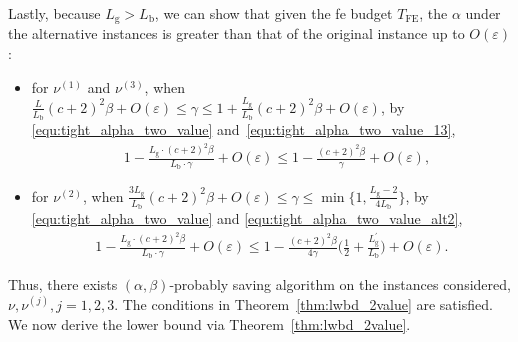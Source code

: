 \documentclass[twoside,11pt]{article}
\newcommand{\rmb}{\mathrm{b}}
\newcommand{\rmg}{\mathrm{g}}
\newcommand{\Tfe}{T_{\mathrm{FE}}}
\begin{document}
Lastly, because $L_{\rmg}>L_{\rmb}$, we can show that given the \ac{fe} budget $\Tfe$, the $\alpha$ under the alternative instances is greater than that of the original instance up to $O(\varepsilon)$:
\begin{itemize}[leftmargin=1em,parsep=1pt]
    \item for $\nu^{(1)}$ and $\nu^{(3)}$, when $ \frac{L}{L_{\rmb}} (c+2)^2\beta  + O(\varepsilon) \leq \gamma \leq
            1 +  \frac{L_{\rmg}}{L_{\rmb}} (c+2)^2\beta + O(\varepsilon)$,
            by \eqref{equ:tight_alpha_two_value} and~\eqref{equ:tight_alpha_two_value_13},
        \begin{align}
            &1-\frac{L_{\rmg}\cdot (c+2)^2\beta}{L_{\rmb}\cdot\gamma}+O(\varepsilon)
            \leq
            1-\frac{(c+2)^2\beta}{\gamma}+O(\varepsilon) , 
        \end{align}
    \item for $\nu^{(2)}$, when $ \frac{3L_{\rmg}}{L_{\rmb}} (c+2)^2\beta  + O(\varepsilon) \leq \gamma \leq
            \min\Big\{1,
            \frac{L_{\rmg}-2}{4L_{\rmb}}
            \Big\}$, by  \eqref{equ:tight_alpha_two_value} and \eqref{equ:tight_alpha_two_value_alt2},
    \begin{align}
        1-\frac{L_{\rmg}\cdot (c+2)^2\beta}{L_{\rmb}\cdot\gamma}+O(\varepsilon)
        \leq 
        1-\frac{(c+2)^2\beta}{4\gamma}\Big(\frac{1}{2}+\frac{L_{\rmg}^\prime}{L_{\rmb}}\Big) +O(\varepsilon).
    \end{align}
\end{itemize}
Thus, there exists $(\alpha,\beta)$-probably saving algorithm on the instances considered, $\nu,\nu^{(j)},j=1,2,3 $. The conditions in Theorem~\ref{thm:lwbd_2value} are satisfied.
We now derive the lower bound via Theorem~\ref{thm:lwbd_2value}.
\end{document}
